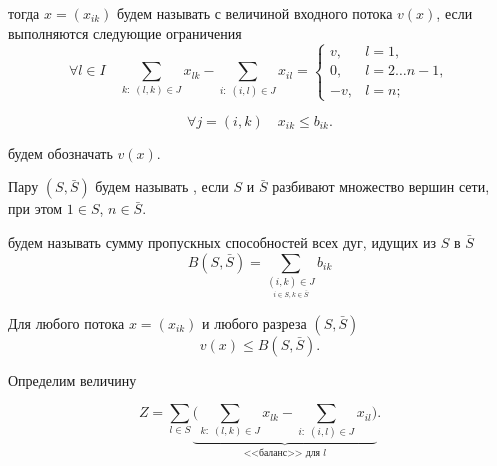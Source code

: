 тогда $x = (x_{ik})$ будем называть  с величиной входного потока $v(x)$, если выполняются следующие ограничения
\[
\forall l \in I \quad \sum_{k:\;(l, k) \in J} x_{lk} - \sum_{i: \; (i, l) \in J} x_{il} = \begin{cases}
	v, & l = 1, \\
	0, & l = 2 \dots n-1, \\
	-v, & l = n;
\end{cases}\tag{1}
\]

\[
\forall j = (i, k) \quad x_{ik} \le b_{ik}\tag{2}.
\]


 будем обозначать $v(x)$.


Пару $(S, \bar{S})$ будем называть , если $S$ и $\bar{S}$ разбивают множество вершин сети, при этом $1 \in S$, $n \in \bar{S}$.


 будем называть сумму пропускных способностей всех дуг, идущих из $S$ в $\bar{S}$
\[
B(S, \bar{S}) = \sum_{\underset{i \in S, k \in \bar{S}}{(i, k) \in J}} b_{ik}
\]


Для любого потока $x = (x_{ik})$ и любого разреза $(S, \bar{S})$
\[
v(x) \le B(S, \bar{S}).
\]

\prooof

Определим величину

\[
Z = \sum_{l \in S} \underbrace{\bigg(\sum_{k:\;(l, k) \in J} x_{lk} - \sum_{i: \; (i, l) \in J} x_{il}\bigg)}_{\text{<<баланс>> для } l}.
\]

